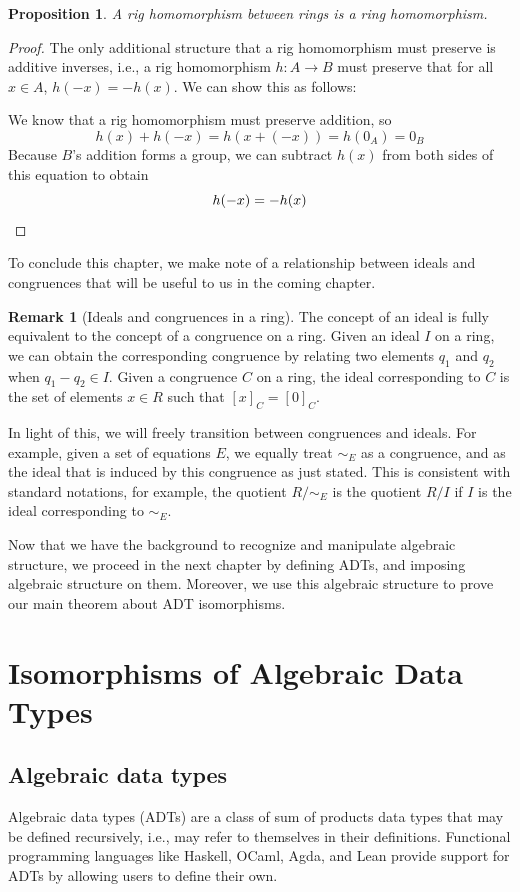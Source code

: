 \documentclass{msthesis}
\newtheorem{prop}[theorem]{Proposition}
\theoremstyle{definition}
\newtheorem*{remark}{Remark}
\begin{document}
\begin{prop}\label{prop:rigringhom}
    A rig homomorphism between rings is a ring homomorphism.
\end{prop}
\begin{proof}
    The only additional structure that a rig homomorphism must preserve is additive inverses, i.e., a rig homomorphism $h : A \to B$ must preserve that for all $x \in A$, $h(-x) = -h(x)$.  We can show this as follows: 
    
    We know that a rig homomorphism must preserve addition, so
    \[ h(x) + h(-x) = h(x + (-x)) = h(0_A) = 0_B \]
    Because $B$'s addition forms a group, we can subtract $h(x)$ from both sides of this equation to obtain
    \[h(-x) = -h(x) \qedhere \]
\end{proof}

To conclude this chapter, we make note of a relationship between ideals and congruences that will be useful to us in the coming chapter.

\begin{remark}[Ideals and congruences in a ring]
    The concept of an ideal is fully equivalent to the concept of a congruence on a ring.  Given an ideal $I$ on a ring, we can obtain the corresponding congruence by relating two elements $q_1$ and $q_2$ when $q_1 - q_2 \in I$.  Given a congruence $C$ on a ring, the ideal corresponding to $C$ is the set of elements $x \in R$ such that $[x]_C = [0]_C$.

    In light of this, we will freely transition between congruences and ideals. For example, given a set of equations $E$, we equally treat $\sim_E$ as a congruence, and as the ideal that is induced by this congruence as just stated.  This is consistent with standard notations, for example, the quotient $R/\sim_E$ is the quotient $R/I$ if $I$ is the ideal corresponding to $\sim_E$.
\end{remark}

Now that we have the background to recognize and manipulate algebraic structure, we proceed in the next chapter by defining ADTs, and imposing algebraic structure on them.  Moreover, we use this algebraic structure to prove our main theorem about ADT isomorphisms.


\chapter{Isomorphisms of Algebraic Data Types}\label{sec:ADTs}

\section{Algebraic data types}
Algebraic data types (ADTs) are a class of sum of products data types that may be defined recursively, i.e., may refer to themselves in their definitions.  Functional programming languages like Haskell, OCaml, Agda, and Lean provide support for ADTs by allowing users to define their own.  
\end{document}
